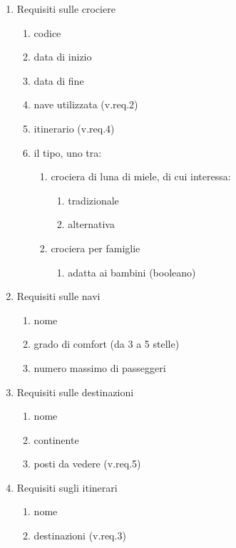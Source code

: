 \documentclass{article}
\begin{document}
\begin{enumerate}
    \item Requisiti sulle crociere
    \begin{enumerate}
        \item codice
        \item data di inizio
        \item data di fine
        \item nave utilizzata (v.req.2)
        \item itinerario (v.req.4)
        \item il tipo, uno tra:
        \begin{enumerate}
            \item crociera di luna di miele, di cui interessa:
            \begin{enumerate}
                \item tradizionale
                \item alternativa
            \end{enumerate}
            \item crociera per famiglie
            \begin{enumerate}
                \item adatta ai bambini (booleano)
            \end{enumerate}
        \end{enumerate}
    \end{enumerate}
    \item Requisiti sulle navi
    \begin{enumerate}
        \item nome
        \item grado di comfort (da 3 a 5 stelle)
        \item numero massimo di passeggeri
    \end{enumerate}
    \item Requisiti sulle destinazioni
    \begin{enumerate}
        \item nome
        \item continente
        \item posti da vedere (v.req.5)
    \end{enumerate}
    \item Requisiti sugli itinerari
    \begin{enumerate}
        \item nome
        \item destinazioni (v.req.3)

\end{enumerate}
\end{enumerate}
\end{document}
